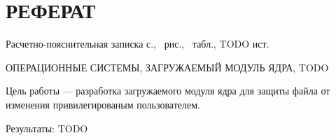 \section*{\large РЕФЕРАТ}

Расчетно-пояснительная записка \pageref{LastPage} с., \totalfigures\ рис., \totaltables\ табл., TODO ист.

ОПЕРАЦИОННЫЕ СИСТЕМЫ, ЗАГРУЖАЕМЫЙ МОДУЛЬ ЯДРА, TODO

Цель работы --- разработка загружаемого модуля ядра для защиты файла от изменения привилегированым пользователем.


Результаты: TODO

\pagebreak